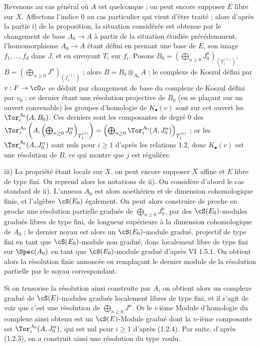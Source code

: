 Revenons au cas général où \(A\) est quelconque ; on peut encore supposer \(E\) libre sur \(X\). Affectons l'indice \(0\) au cas particulier qui vient d'être traité ; alors d'après la partie i) de la proposition, la situation considérée est obtenue par le changement de base \(A_0\to A\) à partir de la situation étudiée précédemment, l'homomorphisme \(A_0\to A\) étant défini en prenant une base de \(E\), son image \(f_1,\ldots,f_d\) dans \(J\), et en envoyant \(T_i\) sur \(f_i\). Posons \(B_0=\left(\bigoplus_{n\ge0}J_0^n\right)_{(T_1^{(1)})}\), \(B=\left(\bigoplus_{n\ge0}J^n\right)_{(f_1^{(1)})}\) ; alors \(B=B_0\otimes_{A_0}A\) ; le complexe de Koszul défini par \(v:F\to\cO_P\) se déduit par changement de base du complexe de Koszul défini par \(v_0\) ; ce dernier étant une résolution projective de \(B_0\) (en se plaçant sur un ouvert convenable) les groupes d'homologie de \(K_\bullet(v)\) sont sur cet ouvert les \(\Tor_i^{A_0}(A,B_0)\). Ces derniers sont les composantes de degré \(0\) des \(\Tor_i^{A_0}\left(A,\left(\bigoplus_{n\ge0}J_0^n\right)_{T_1^{(1)}}\right)=\left(\bigoplus_{n\ge0}\Tor_i^{A_0}(A,J_0^n)\right)_{T_1^{(1)}}\) ; or les \(\Tor_i^{A_0}(A,J_0^n)\) sont nuls pour \(i\ge1\) d'après les relations 1.2, donc \(K_\bullet(v)\) est une résolution de \(B\), ce qui montre que \(j\) est régulière.

iii) La propriété étant locale sur \(X\), on peut encore supposer \(X\) affine et \(E\) libre de type fini. On reprend alors les notations de ii). On considère d'abord le cas standard de ii). L'anneau \(A_0\) est alors noethérien et de dimension cohomologique finie, et l'algèbre \(\cS(E_0)\)
également. On peut alors construire de proche en proche une résolution partielle graduée de \(\bigoplus_{n\ge0}J_0^n\), par des \(\cS(E_0)\)-modules gradués libres de type fini, de longueur supérieure à la dimension cohomologique de \(A_0\) ; le dernier noyau est alors un \(\cS(E_0)\)-module gradué, projectif de type fini en tant que \(\cS(E_0)\)-module non gradué, donc localement libre de type fini sur \(\Spec(A_0)\) en tant que \(\cS(E_0)\)-module gradué d'après VI 1.5.1. On obtient alors la résolution finie annoncée en remplaçant le dernier module de la résolution partielle par le noyau correspondant.

Si on tensorise la résolution ainsi construite par \(A\), on obtient alors un complexe gradué de \(\cS(E)\)-modules gradués localement libres de type fini, et il s'agit de voir que c'est une résolution de \(\bigoplus_{n\ge0}J^n\). Or le \(i\)-ième Module d'homologie du complexe ainsi obtenu est un \(\cS(E)\)-Module gradué dont la \(n\)-ième composante est \(\Tor_i^{A_0}(A,J_0^n)\), qui est nul pour \(i\ge1\) d'après (1.2.4). Par suite, d'après (1.2.3), on a construit ainsi une résolution du type voulu.

